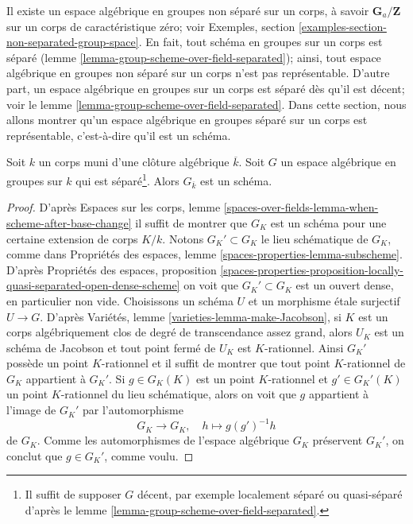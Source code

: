 \noindent
Il existe un espace algébrique en groupes non séparé sur un corps,
à savoir $\mathbf{G}_a/\mathbf{Z}$ sur un corps de caractéristique zéro; voir
Exemples, section \ref{examples-section-non-separated-group-space}.
En fait, tout schéma en groupes sur un corps est séparé
(lemme \ref{lemma-group-scheme-over-field-separated});
ainsi, tout espace algébrique en groupes non séparé sur un corps
n'est pas représentable. D'autre part, un espace algébrique en
groupes sur un corps est séparé dès qu'il est décent; voir le
lemme \ref{lemma-group-scheme-over-field-separated}.
Dans cette section, nous allons montrer qu'un
espace algébrique en groupes séparé sur un corps
est représentable, c'est-à-dire qu'il est un schéma.

\begin{lemma}
\label{lemma-group-space-scheme-over-kbar}
Soit $k$ un corps muni d'une clôture algébrique $\overline{k}$.
Soit $G$ un espace algébrique en groupes sur $k$
qui est séparé\footnote{Il suffit de supposer $G$ décent,
par exemple localement séparé ou quasi-séparé d'après le
lemme \ref{lemma-group-scheme-over-field-separated}.}.
Alors $G_{\overline{k}}$ est un schéma.
\end{lemma}

\begin{proof}
D'après Espaces sur les corps, lemme
\ref{spaces-over-fields-lemma-when-scheme-after-base-change}
il suffit de montrer que $G_K$ est un schéma pour une certaine extension de corps
$K/k$. Notons $G_K' \subset G_K$ le lieu schématique
de $G_K$, comme dans Propriétés des espaces, lemme
\ref{spaces-properties-lemma-subscheme}.
D'après Propriétés des espaces, proposition
\ref{spaces-properties-proposition-locally-quasi-separated-open-dense-scheme}
on voit que $G_K' \subset G_K$ est un ouvert dense, en particulier non vide.
Choisissons un schéma $U$ et un morphisme étale surjectif $U \to G$. D'après
Variétés, lemme \ref{varieties-lemma-make-Jacobson},
si $K$ est un corps algébriquement clos de degré de transcendance assez
grand, alors $U_K$ est un schéma de Jacobson et
tout point fermé de $U_K$ est $K$-rationnel.
Ainsi $G_K'$ possède un point $K$-rationnel et il suffit
de montrer que tout point $K$-rationnel de $G_K$ appartient à $G_K'$.
Si $g \in G_K(K)$ est un point $K$-rationnel et $g' \in G_K'(K)$
un point $K$-rationnel du lieu schématique, alors on voit que
$g$ appartient à l'image de $G_K'$ par l'automorphisme
$$
G_K \longrightarrow G_K,\quad
h \longmapsto g(g')^{-1}h
$$
de $G_K$. Comme les automorphismes de l'espace algébrique $G_K$ préservent
$G_K'$, on conclut que $g \in G_K'$, comme voulu.
\end{proof}

